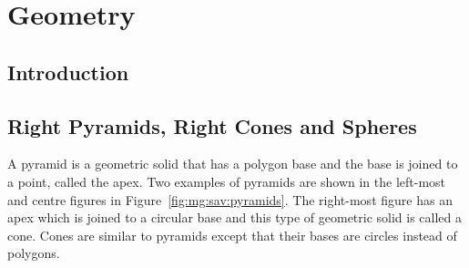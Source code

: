 \chapter{Geometry}
\label{m:g11}

\section{Introduction}




\section{Right Pyramids, Right Cones and Spheres}

A pyramid is a geometric solid that has a polygon base and the base is joined to a point, called the apex. Two examples of pyramids are shown in the left-most and centre figures in Figure~\ref{fig:mg:sav:pyramids}. The right-most figure has an apex which is joined to a circular base and this type of geometric solid is called a cone. Cones are similar to pyramids except that their bases are circles instead of polygons.

